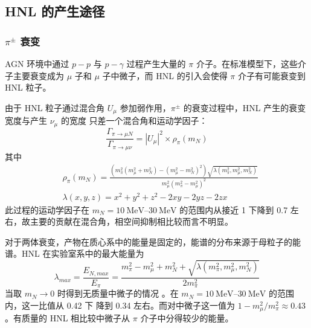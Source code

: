 \documentclass[UTF8]{ctexart}
\begin{document}
\subsection{HNL 的产生途径}

\subsubsection{$\pi^\pm$ 衰变}
AGN 环境中通过 $p - p$ 与 $p - \gamma$ 过程产生大量的 $\pi$ 介子。在标准模型下，这些介子主要衰变成为 $\mu$ 子和 $\mu$ 子中微子，而 HNL
的引入会使得 $\pi$ 介子有可能衰变到 HNL 粒子。
\begin{center}
\end{center}
由于 HNL 粒子通过混合角 $U_{\mu}$ 参加弱作用，$\pi^\pm$ 的衰变过程中，HNL 产生的衰变宽度与产生 $\nu_\mu$ 的宽度
只差一个混合角和运动学因子：
\begin{equation}
  \frac{\Gamma_{\pi \to \mu N}}{\Gamma_{\pi \to \mu \nu}} =
  |U_{\mu}|^2 \times \rho_\pi (m_N)
\end{equation}
其中
\begin{align}
  &\rho_\pi (m_N) = \frac{(m_\pi^2 (m_\mu^2 + m_N^2) - (m_\mu^2 - m_N^2)^2) \sqrt{\lambda(m_\pi^2, m_\mu^2, m_N^2)}}{m_\mu^2 (m_\pi^2 - m_\mu^2)^2} \label{eq:rho_pi} \\
  &\lambda(x, y, z) = x^2 + y^2 + z^2 - 2xy - 2yz - 2zx
\end{align}
此过程的运动学因子在 $m_N = \qtyrange{10}{30}{\mega\electronvolt}$ 的范围内从接近 1 下降到 0.7 左右，故主要的贡献在混合角，相空间抑制相比较而言不明显。

对于两体衰变，产物在质心系中的能量是固定的，能谱的分布来源于母粒子的能谱。HNL 在实验室系中的最大能量为
\begin{equation}
  \lambda_{max} = \frac{E_{N,max}}{E_\pi} = \frac{m_\pi^2 - m_\mu^2 + m_N^2 + \sqrt{\lambda(m_\pi^2, m_\mu^2, m_N^2)}}{2 m_\pi^2}
\end{equation}
当取 $m_N \to 0$ 时得到无质量中微子的情况 \cite{kelner2006energy}。在 $m_N = \qtyrange{10}{30}{\mega\electronvolt}$ 的范围内，这一比值从 0.42 下
降到 0.34 左右。而对中微子这一值为 $1 - m_\mu^2 / m_\pi^2 \approx 0.43$。有质量的 HNL 相比较中微子从 $\pi$ 介子中分得较少的能量。
\end{document}
